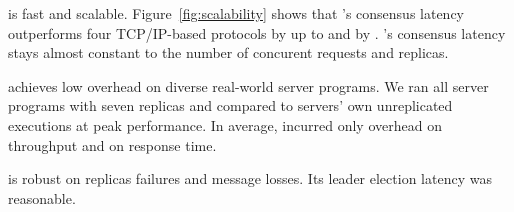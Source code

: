 \begin{tightenum}

\item \xxx is fast and scalable. Figure~\ref{fig:scalability} shows that \xxx's 
consensus latency outperforms four TCP/IP-based \paxos protocols by up
to \comptradhigh and \dare by \fasterDARE. \xxx's consensus latency stays 
almost constant to the number of concurent requests and replicas.



\item \xxx achieves low overhead on diverse real-world server programs. We ran 
all \nprog server programs with seven replicas and compared to servers' own 
unreplicated executions at peak performance. In average, \xxx incurred only 
\tputoverhead overhead on throughput and \latencyoverhead on response time.
 
\item \xxx is robust on replicas failures and message losses. Its leader 
election latency was reasonable.



\end{tightenum}








